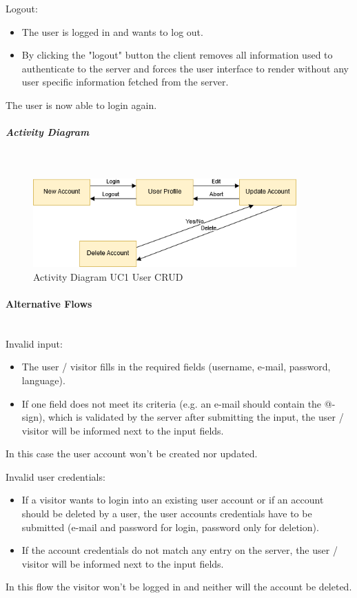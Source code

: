 \noindent
Logout:
\begin{itemize}
	\vspace{-3mm}
	\setlength\itemsep{-1em}
	\item The user is logged in and wants to log out.
	\item By clicking the "logout" button the client removes all information used to authenticate to the server and forces the user interface to render without any user specific information fetched from the server.
\end{itemize}
The user is now able to login again.


\newpage
\subparagraph{Activity Diagram}\mbox{}\\
\begin{figure}[H]
	\centering
	\includegraphics[width=0.9\textwidth]{Content/Domain/UC1UserCRUDactivitydiagram.png}
	\caption{Activity Diagram \ac{UC}1 User CRUD}
	\label{fig:activityDiagramUC1}
\end{figure}

\paragraph*{Alternative Flows}\mbox{}\\

\noindent
Invalid input: 
\begin{itemize}
	\vspace{-3mm}
	\setlength\itemsep{-1em}
	\item The user / visitor fills in the required fields (username, e-mail, password, language).
	\item If one field does not meet its criteria (e.g. an e-mail should contain the @-sign), which is validated by the server after submitting the input, the user / visitor will be informed next to the input fields.
\end{itemize} 
In this case the user account won't be created nor updated.

\noindent
Invalid user credentials:
\begin{itemize}
	\vspace{-3mm}
	\setlength\itemsep{-1em}
	\item If a visitor wants to login into an existing user account or if an account should be deleted by a user, the user accounts credentials have to be submitted (e-mail and password for login, password only for deletion).
	\item If the account credentials do not match any entry on the server, the user / visitor will be informed next to the input fields.
\end{itemize}
In this flow the visitor won't be logged in and neither will the account be deleted.

